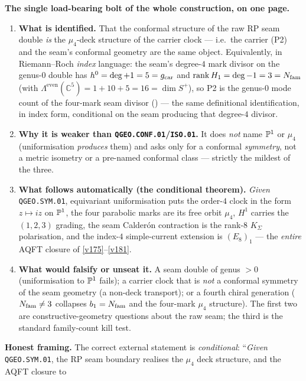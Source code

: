 \begin{keybox}
\textbf{The single load-bearing bolt of the whole construction, on one page.}
\begin{enumerate}[leftmargin=1.6em,itemsep=1pt]
\item \textbf{What is identified.} That the conformal structure of the raw RP seam double \emph{is} the
$\mu_4$-deck structure of the carrier clock --- i.e.\ the carrier (P2) and the seam's conformal geometry
are the same object. Equivalently, in Riemann--Roch \emph{index} language: the seam's degree-$4$ mark
divisor on the genus-$0$ double has $h^0=\deg{+}1=5=g_{\mathrm{car}}$ and $\operatorname{rank}H_1=\deg{-}1=3=N_{\mathrm{fam}}$
(with $\Lambda^{\mathrm{even}}(\mathbb C^5)=1{+}10{+}5=16=\dim S^+$), so P2 is the genus-$0$ mode count of the
four-mark seam divisor () --- the same definitional identification, in index
form, conditional on the seam producing that degree-$4$ divisor.
\item \textbf{Why it is weaker than \texttt{QGEO.CONF.01}/\texttt{ISO.01}.} It does \emph{not} name
$\mathbb P^1$ or $\mu_4$ (uniformisation \emph{produces} them) and asks only for a conformal \emph{symmetry},
not a metric isometry or a pre-named conformal class --- strictly the mildest of the three.
\item \textbf{What follows automatically (the conditional theorem).} \emph{Given} \texttt{QGEO.SYM.01},
equivariant uniformisation puts the order-$4$ clock in the form $z\mapsto iz$ on $\mathbb P^1$, the four
parabolic marks are its free orbit $\mu_4$, $H^1$ carries the $(1,2,3)$ grading, the seam Calder\'on
contraction is the rank-$8$ $K_\Sigma$ polarisation, and the index-$4$ simple-current extension is
$(E_8)_1$ --- the \emph{entire} AQFT closure of \vref{v175}--\vref{v181}.
\item \textbf{What would falsify or unseat it.} A seam double of genus $>0$ (uniformisation to $\mathbb P^1$
fails); a carrier clock that is \emph{not} a conformal symmetry of the seam geometry (a non-deck
transport); or a fourth chiral generation ($N_{\mathrm{fam}}\neq3$ collapses $b_1=N_{\mathrm{fam}}$ and the four-mark $\mu_4$
structure). The first two are constructive-geometry questions about the raw seam; the third is the
standard family-count kill test.
\end{enumerate}
\noindent\textbf{Honest framing.} The correct external statement is \emph{conditional}: ``\emph{Given}
\texttt{QGEO.SYM.01}, the RP seam boundary realises the $\mu_4$ deck structure, and the AQFT closure to

\end{keybox}
